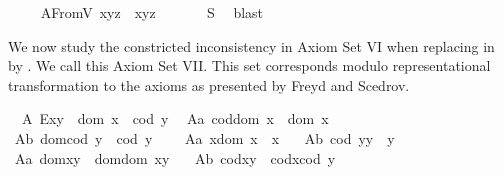 \begin{isabellebody}
\endisatagproof
{\isafoldproof}%
%
\isadelimproof
\isanewline
%
\endisadelimproof
\ \ \isamarkupfalse%
\ \ A{}FromV{\isacharcolon}\ {\isachardoublequoteopen}x{\isasymcdot}{\isacharparenleft}y{\isasymcdot}z{\isacharparenright}\ {\isasymcong}\ {\isacharparenleft}x{\isasymcdot}y{\isacharparenright}{\isasymcdot}z{\isachardoublequoteclose}\ \isanewline
%
\isadelimproof
\ \ \ \ %
\endisadelimproof
%
\isatagproof
{}\isamarkupfalse%
\ S{}\ \isamarkupfalse%
\ blast%
\endisatagproof
{\isafoldproof}%
%
\isadelimproof
%
\endisadelimproof
%
\isamarkuptrue%
%
\begin{isamarkuptext}%
We now study the constricted inconsistency in Axiom Set VI when replacing  \isa{{\isasymsimeq}}  
 in   by  \isa{{\isasymcong}}. We call this Axiom Set VII. This set corresponds
 modulo representational transformation to the axioms as presented by Freyd and Scedrov.%
\end{isamarkuptext}\isamarkuptrue%
\ \ A{}{\isacharcolon}\ {\isachardoublequoteopen}E{\isacharparenleft}x{\isasymcdot}y{\isacharparenright}\ \isactrlbold {\isasymleftrightarrow}\ dom\ x\ {\isasymcong}\ cod\ y{\isachardoublequoteclose}\ \isanewline
\ A{}a{\isacharcolon}\ {\isachardoublequoteopen}cod{\isacharparenleft}dom\ x{\isacharparenright}\ {\isasymcong}\ dom\ x\ {\isachardoublequoteclose}\ \ \ \isanewline
\ A{}b{\isacharcolon}\ {\isachardoublequoteopen}dom{\isacharparenleft}cod\ y{\isacharparenright}\ {\isasymcong}\ cod\ y{\isachardoublequoteclose}\ \ \ \isanewline
\ A{}a{\isacharcolon}\ {\isachardoublequoteopen}x{\isasymcdot}{\isacharparenleft}dom\ x{\isacharparenright}\ {\isasymcong}\ x{\isachardoublequoteclose}\ \ \isanewline
\ A{}b{\isacharcolon}\ {\isachardoublequoteopen}{\isacharparenleft}cod\ y{\isacharparenright}{\isasymcdot}y\ {\isasymcong}\ y{\isachardoublequoteclose}\ \ \isanewline
\ A{}a{\isacharcolon}\ {\isachardoublequoteopen}dom{\isacharparenleft}x{\isasymcdot}y{\isacharparenright}\ {\isasymcong}\ dom{\isacharparenleft}{\isacharparenleft}dom\ x{\isacharparenright}{\isasymcdot}y{\isacharparenright}{\isachardoublequoteclose}\ \ \isanewline
\ A{}b{\isacharcolon}\ {\isachardoublequoteopen}cod{\isacharparenleft}x{\isasymcdot}y{\isacharparenright}\ {\isasymcong}\ cod{\isacharparenleft}x{\isasymcdot}{\isacharparenleft}cod\ y{\isacharparenright}{\isacharparenright}{\isachardoublequoteclose}\ \ \isanewline

\end{isabellebody}
